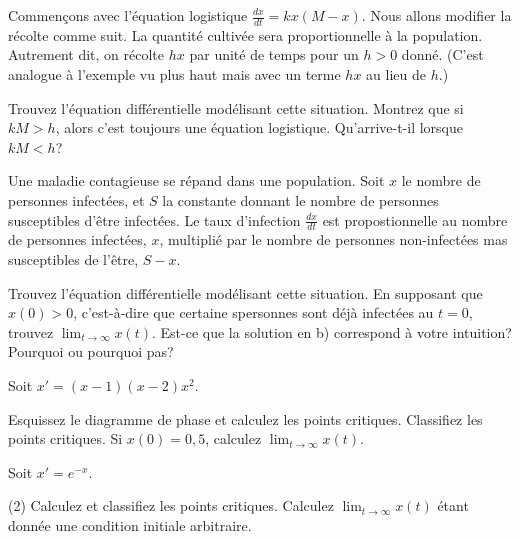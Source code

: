 \begin{exercise}
	Commençons avec l'équation logistique $\frac{dx}{dt} = kx(M-x)$.
	Nous allons modifier la récolte comme suit.  La quantité cultivée sera proportionnelle à la population.
	Autrement dit, on récolte $hx$	par unité de temps pour un  $h > 0$ donné.
	(C'est analogue à l'exemple vu plus haut mais avec un terme $hx$ au lieu de  $h$.)
	\begin{tasks}
		\task Trouvez l'équation différentielle modélisant cette situation.
		\task Montrez que si $kM > h$, alors c'est toujours une équation logistique.
		\task Qu'arrive-t-il lorsque  $kM < h$?
	\end{tasks}
\end{exercise}

\begin{exercise}
	Une maladie contagieuse se répand dans une population.
	Soit $x$ le nombre de personnes infectées, et $S$ la constante donnant le nombre de personnes susceptibles  d'être infectées.
	Le taux d'infection $\frac{dx}{dt}$ est propostionnelle au nombre de personnes infectées, $x$,
	multiplié par le nombre de personnes non-infectées mas susceptibles de l'être, $S-x$.
	\begin{tasks}
		\task Trouvez l'équation différentielle modélisant cette situation.
		\task En supposant que $x(0) > 0$, c'est-à-dire que certaine spersonnes sont déjà infectées au $t=0$,
				trouvez $\displaystyle \lim_{t\to\infty} x(t)$.
		\task Est-ce que la solution en b) correspond à votre intuition? Pourquoi ou pourquoi pas?
	\end{tasks}
\end{exercise}


\setcounter{exercise}{100}

\begin{exercise}
	Soit $x'=(x-1)(x-2)x^2$.
	\begin{tasks}
		\task Esquissez le diagramme de phase et calculez les points critiques.
		\task Classifiez les points critiques.
		\task Si $x(0)=0{,}5$, calculez $\displaystyle \lim_{t\to\infty} x(t)$.
	\end{tasks}
\end{exercise}

\begin{exercise}
	Soit $x'=e^{-x}$.
	\begin{tasks}(2)
		\task Calculez et classifiez les points critiques.
		\task Calculez $\displaystyle \lim_{t\to\infty} x(t)$ étant donnée une condition initiale arbitraire.
	\end{tasks}
\end{exercise}

